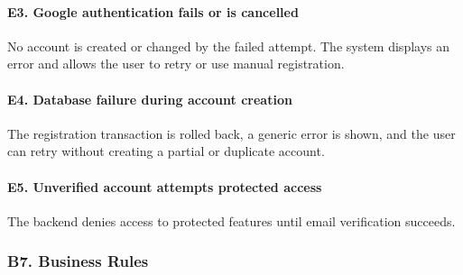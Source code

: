 \documentclass[12pt]{article}
\begin{document}
\hypertarget{sec:e3-google-authentication-fails-or-is-cancelled}{}
\paragraph*{E3. Google authentication fails or is cancelled}
\par\medskip

No account is created or changed by the failed attempt. The system displays an error and allows the user to retry or use manual registration.
\par\medskip

\hypertarget{sec:e4-database-failure-during-account-creation}{}
\paragraph*{E4. Database failure during account creation}
\par\medskip

The registration transaction is rolled back, a generic error is shown, and the user can retry without creating a partial or duplicate account.
\par\medskip

\hypertarget{sec:e5-unverified-account-attempts-protected-access}{}
\paragraph*{E5. Unverified account attempts protected access}
\par\medskip

The backend denies access to protected features until email verification succeeds.
\par\medskip

\hypertarget{sec:b7-business-rules}{}
\subsubsection*{B7. Business Rules}
\par\medskip
\end{document}
